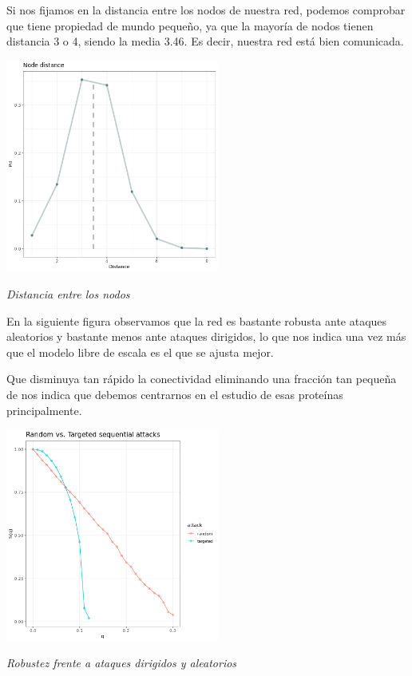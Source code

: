 Si nos fijamos en la distancia entre los nodos de nuestra red, podemos comprobar que tiene propiedad de mundo pequeño, ya que la mayoría de nodos tienen distancia 3 o 4, 
siendo la media 3.46.
Es decir, nuestra red está bien comunicada.

\begin{center}

\includegraphics[width=70mm,scale=1.2]{report/figures/Node_distance.png}

\caption{\textit{Distancia entre los nodos}}

\end{center}

En la siguiente figura observamos que la red es bastante robusta ante ataques aleatorios y bastante menos ante ataques dirigidos, lo que nos indica una vez más que el modelo
libre de escala es el que se ajusta mejor.

Que disminuya tan rápido la conectividad eliminando una fracción tan pequeña de nos indica que debemos centrarnos en el estudio de esas proteínas principalmente.

\begin{center}

\includegraphics[width=70mm,scale=1.2]{report/figures/sequential_attacks.png}

\caption{\textit{Robustez frente a ataques dirigidos y aleatorios}}

\end{center}

